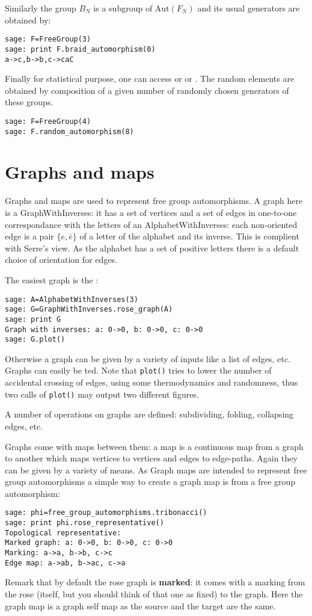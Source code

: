 \documentclass[10pt,a4paper]{article}
\newcommand{\Aut}{\text{Aut}}
\newcommand{\FN}{F_N}
\begin{document}
Similarly the  group $B_N$ is a subgroup of $\Aut(\FN)$ and its usual generators are obtained by:
\begin{verbatim}
sage: F=FreeGroup(3)
sage: print F.braid_automorphism(0)
a->c,b->b,c->caC
\end{verbatim}

Finally for statistical purpose, one can access  or  or . The random elements are obtained by composition of a given number
of randomly chosen generators of these groups.
\begin{verbatim}
sage: F=FreeGroup(4)
sage: F.random_automorphism(8)
\end{verbatim}

\section{Graphs and maps}

Graphs and maps are used to represent free group automorphisms. A
graph here is a GraphWithInverses: it has a set of vertices and a set
of edges in one-to-one correspondance with the letters of an
AlphabetWithInverses: each non-oriented edge is a pair $\{e,\bar e\}$
of a letter of the alphabet and its inverse. This is complient with
Serre's view. As the alphabet has a set of positive letters there is a
default choice of orientation for edges.

The easiest graph is the :
\begin{verbatim}
sage: A=AlphabetWithInverses(3)
sage: G=GraphWithInverses.rose_graph(A)
sage: print G
Graph with inverses: a: 0->0, b: 0->0, c: 0->0
sage: G.plot()
\end{verbatim}
Otherwise a graph can be given by a variety of inputs like a list of
edges, etc. Graphs can easily be ted. Note that
\texttt{plot()} tries to lower the number of accidental crossing of
edges, using some thermodynamics and randomness, thus two calls of
\texttt{plot()} may output two different figures.

A number of operations on graphs are defined: subdividing, folding,
collapsing edges, etc.

Graphs come with maps between them: a map is a continuous map from a
graph to another which maps vertices to vertices and edges to
edge-paths. Again they can be given by a variety of means. As Graph
maps are intended to represent free group automorphisms a simple way
to create a graph map is from a free group automorphism:
\begin{verbatim}
sage: phi=free_group_automorphisms.tribonacci()
sage: print phi.rose_representative()
Topological representative:
Marked graph: a: 0->0, b: 0->0, c: 0->0
Marking: a->a, b->b, c->c
Edge map: a->ab, b->ac, c->a
\end{verbatim}
Remark that by default the rose graph is \textbf{marked}: it comes
with a marking from the rose (itself, but you should think of that one
as fixed) to the graph. Here the graph map is a graph self map as the
source and the target are the same.
\end{document}
